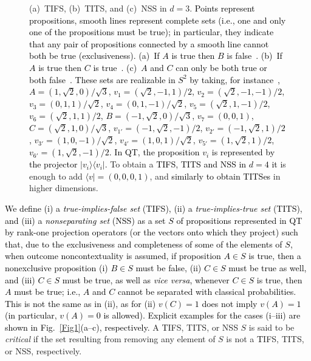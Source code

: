 \documentclass[%
  twocolumn,
 showpacs,
 showkeys,
 preprintnumbers,
 amsmath,amssymb,
 aps,
  pra,
  longbibliography,
 floatfix,
 ]{revtex4-1}
\newcommand{\karl}[1]{\textcolor{black}{#1}}
\begin{document}
\begin{figure}
{(a)~TIFS,  (b)~TITS, and (c)~NSS in $d=3$.
\karl{Points represent propositions, smooth lines represent complete sets
(i.e., one and only one of the propositions must be true); in particular, they indicate
that any pair of propositions connected by a smooth line cannot both be true (exclusiveness).}
\karl{(a)~If $A$ is true then $B$ is false~\cite[Fig.~1, p.~182]{code2}.
(b)~If $A$ is true then $C$ is true~\cite[$\Gamma_1$]{KS67}.
(c)~$A$ and $C$ can only be both true or both false~\cite[$\Gamma_3$]{KS67}.
These sets are realizable in  $S^2$ by taking,
for instance~\cite[p.~206, Fig.~1]{tkadlec-96},
$A     = (    1,\sqrt{2},0     )/\sqrt{3}$,
$v_1     = (   \sqrt{2},-1,1     )/2$,
$v_2     = (   \sqrt{2},-1,-1     )/2$,
$v_3     = (    0,1,1     )/\sqrt{2}$,
$v_4     = (    0,1,-1     )/\sqrt{2}$,
$v_5     = (   \sqrt{2},1,-1     )/2$,
$v_6     = (   \sqrt{2},1,1     )/2$,
$B   = (    -1,\sqrt{2},0     )/\sqrt{3}$,
$v_7          = (    0,0,1     ) $,
$C     = (   \sqrt{2},1,0     )/\sqrt{3} $,
$v_{1'}     = (    -1,\sqrt{2},-1     )/2 $,
$v_{2'}     = (    -1,\sqrt{2},1     )/2 $,
$v_{3'}     = (    1,0,-1     )/\sqrt{2} $,
$v_{4'}     = (    1,0,1     )/\sqrt{2} $,
$v_{5'}     = (    1,\sqrt{2},1     )/2 $,
$v_{6'}     = (    1,\sqrt{2},-1     )/2 $.
In QT, the proposition $v_i$ is represented by the projector $| v_i \rangle\langle v_i |$.
}
To obtain a \karl{TIFS, TITS and NSS in $d=4$ it}
is enough to add \karl{$\langle v| = (0,0,0,1)$}, and \karl{similarly to obtain TITSes} in higher dimensions.}
\end{figure}

\karl{We define
(i) a {\em true-implies-false set} (TIFS),
(ii) a {\em true-implies-true set} (TITS),
and
(iii) a {\em nonseparating set} (NSS)
as a set $S$ of propositions represented in
QT by rank-one projection operators (or the vectors onto which they project) such that,
due to the exclusiveness and completeness of some of the elements of $S$,
when outcome noncontextuality is assumed,
if proposition $A \in S$ is true,
then a nonexclusive proposition
(i)
$B \in S$  must be false,
(ii)
$C \in S$  must be true as well,
and
(iii)  $C \in S$ must be true, as well as {\it vice versa}, whenever  $C \in S$ is true, then $A$ must be true; i.e.,
$A$ and $C$ cannot be separated with classical probabilities.
This is not the same as in (ii), as for (ii) $v(C)=1$  does not imply $v(A)=1$ (in particular, $v(A)=0$ is allowed).
Explicit examples for the cases (i--iii) are shown in Fig.~\ref{Fig1}(a--c), respectively.}
A {\karl TIFS, TITS, or NSS} $S$ is said to be {\em critical}
if the set resulting from removing any element of $S$ is not a {\karl TIFS, TITS, or NSS, respectively.}
\end{document}
